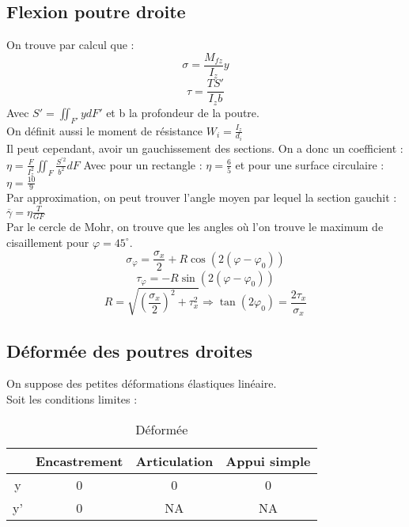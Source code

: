 \documentclass[../main.tex]{subfiles}
\begin{document}
\subsection{Flexion poutre droite}
On trouve par calcul que :\\
\begin{equation}
    \sigma = \frac{M_{fz}}{I_z} y
\end{equation}
\begin{equation}
    \tau = \frac{TS'}{I_z b}
\end{equation}
Avec $S' = \iint_{F'} ydF'$ et b la profondeur de la poutre. \\
On définit aussi le moment de résistance $W_i = \frac{I_z}{d_i}$\\

Il peut cependant, avoir un gauchissement des sections. On a donc un coefficient :\\
$\eta = \frac{F}{I_z^2} \iint_F \frac{S^{'2}}{b^2}dF$ Avec pour un rectangle : $\eta = \frac{6}{5}$ et pour une surface circulaire : $\eta = \frac{10}{9}$\\
Par approximation, on peut trouver l'angle moyen par lequel la section gauchit : $\overline{\gamma} = \eta \frac{T}{GF}$\\

Par le cercle de Mohr, on trouve que les angles où l'on trouve le maximum de cisaillement pour $\varphi = 45^{\circ}$. \\
\begin{equation}
    \sigma_{\varphi} = \frac{\sigma_x}{2} +R \cos(2(\varphi-\varphi_0))
\end{equation}
\begin{equation}
    \tau_{\varphi} = -R\sin(2(\varphi-\varphi_0))
\end{equation}
\begin{equation}
    R = \sqrt{(\frac{\sigma_x}{2})^2+\tau_x^2} \Rightarrow \tan(2\varphi_0) = \frac{2\tau_x}{\sigma_x}
\end{equation}

\subsection{Déformée des poutres droites}
On suppose des petites déformations élastiques linéaire.\\
Soit les conditions limites :\\
\begin{table}[hbt!]
    \centering
    \begin{tabular}{||c|c|c|c|}
    \hline
      & Encastrement & Articulation & Appui simple \\
        \hline
        y & 0 & 0 & 0\\
        y' & 0 & NA & NA\\
        \hline
    \end{tabular}
    \caption{Déformée}
\end{table}
\end{document}
